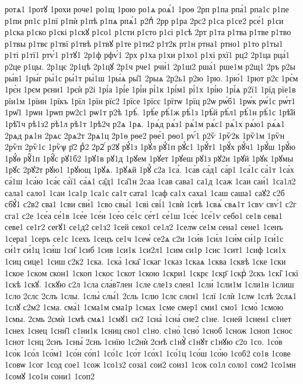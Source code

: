 {ротѧ1
1ротꙋ
1рохи
роче1
ро1щ
1рою
ро1ѧ
роѧ́1
1роѳ
2рп
р1па
рпа́1
рпа1с
р1пе
р1пи
рп1с
р1пї
р1пѝ
р1пѣ
р1пѧ
рпѧ́1
р2пⷣ
2рр
р1ра
2рс2
р1са
р1се2
рсе́1
р1си
р1ска
р1ско
р1скі
р1скꙋ
р1со1
р1сти
р1сто
р1сі
р1сѣ
2рт
р1та
р1тва
р1тве
р1тво
р1твы
р1твє
р1твї
р1твѣ
р1твꙋ
р1те
р1ти2
р1т2к
рт1н
ртна1
ртно1
р1то
р1ты1
р1ті
р1тї1
ртѵ́1
р1тꙋ1
2р1ф
рфѵ́1
2рх
р1ха
р1хи
р1хо1
р1хі
рхї1
рц2
2р1ца
рца́1
р2це
р1цы.
2р1цє
2р1цѣ
2р1цꙋ
2р1ч
рче1
рчи́1
2р1ш2
рша́1
рше1м
р2щ1
2ръ
р2ы
ры́в1
1ры́г
ры́1с
ры́1т
ры́1ш
1ры́ѧ
ры̑1
2рыѧ
2р2ь1
р2ю
1рю.
1рю́1
1рют
р2є
1рє́м
1рє́н
1рєм
рєни1
1рєѝ
р2і
1рі́а
1рі́е
1рі́и
рі́1к
1рі́м1
рі́1х
1рі́ю
1рі́ѧ
р2ї1
1рїд
рїе1в
рїи1м
1рїин
1рїкъ
1рїл
1рїн
рїс2
1рїсе
1рїсє
1рїтѡ
1рїц
р2ѡ
рѡ́б1
1рѡ́к
рѡ́1с
рѡ́т1
1рѡ̑1
1рѡн
1рѡп
рѡ2с1
рѡ1т
р2ѣ
1рѣ́.
1рѣ́е
рѣ́1ж
рѣ́1з
1рѣ́й
рѣ́л1
рѣ́1н
рѣ́1с
1рѣ̑й
1рѣ̑1ч
рѣ1з2
рѣ1л
рѣ1т
1рѣ2ч
р2ѧ
1рѧ.
1рѧ́д
рѧ́з1
рѧ́1м
рѧ́с1
рѧ́1х
рѧ́ю1
рѧ́ѧ1
2рѧд
рѧ1н
2рѧс
2рѧ2т
2рѧ1ц
2р1ѳ
рѳе2
рѳе́1
рѳо1
рѵ́1
р2ѷ
1рѷ2к
1рѷ1м
1рѷн
2рѷп
2рѷ1с
1рѷѱ
р҃2
рⷣ2
2р2ⷭ
р2ꙋ
рꙋ́1з
1рꙋ́л
рꙋ́1п
рꙋ́с1
1рꙋ́т1
1рꙋ́х
рꙋ́ч1
1рꙋ́ш
1рꙋ́ю
1рꙋ́ѳ
рꙋ̑1п
1рꙋ̑с
рꙋ1б2
1рꙋ1в
рꙋ1д
1рꙋем
1рꙋет
1рꙋеш
рꙋ1з
рꙋ2и
1рꙋй
1рꙋк
1рꙋмы
1рꙋс
2рꙋ2т
рꙋю1
1рꙋющ
1рꙋѧ.
1рꙋѧй
1рꙋⷯ
с2а
1са́.
1са́в
са́д1
са́р1
1са́1с
са́1т
1са́х
са́1ш
1са́ю
1са́є
са́ї1
са́ѧ1
са̑д1
1са̑1н
2саа
1сав
сава1
са1д
1саж
1саи
саи́1
1са1л2
сала1
сало1
1сан
1са1р
1са1с
са1т
сата1
1саф
са1х
саха1
1саш
саша1
саꙋ2
с2б
сбꙋ́1
с2в2
сва1
1сви
сви́1
1сво
свы́1
1сві
сві́1
1свѝ
1свѣ
1свѧ́
свѧ1т
1свѵ
свѵ́1
с2г
сга1
с2е
1се́а
се́1в
1се́е
1се́и
1се́о
се́1с
се́т1
се́1ш
1се́є
1се́1ѵ
себо1
се1в
сева1
севе1
се1г2
сегꙋ1
се1д2
се1з2
1сей
секо1
се1л2
1селѡ
се1м
сена1
сене1
1сенъ
1сера1
1серъ
се1с
1сехъ
1сецъ
се1ч
1сеѡ́
се2ѧ
с2и
1си́в
1си́л
1си́м
си́1р
1си́1с
си́1т
си́1ц
1си́ш
1си̑
1сиб
1сив
1си1к
1си2л1
1сим
си1р
1сис
1сит1
1сиф
1си1х
1сиц
сице1
1сиш
с2к2
1ска.
1ска̀
1ска̑
1скаг
1сказ
1скаѧ
1сква
1сквѣ
1ске
1ски
1ское
1ском
скон1
1скоп
1скос
1скот
1скою
1скри1
1скрє
1скр҃
1скрⷭ
2скъ
1скі̑
1скї
1скѣ
1скꙋ.
1скꙋю
с2л
1сла
сла́в7лен
1сле
сле1з
слен1
1сли́
1сли1м
1сли1н
1слиш
1сло
2слс
2слъ
1слы.
1слы̀
слы́1
2сль
1слю
1слє
слєн1
1слї
1слѝ
1слѡ
1слѣ
2слѧ1
1слꙋ
с2м2
1сма.
сма́1
1сма1м
сма1р
1смах
1сме
смер1
сми1
смо1
1смо̀
1смою
1смы.
2смь
2смѝ
1смѣ
смѧ1
1смꙋ1
сн2
1сна̀
1сна́
сне2
с1не.
1сней
1снен1
с1нет
1снех
1снец
1сни̑1
с1ни1к
1сниц
сно1
с1но.
с1но̀
1сно́
1сноб
1снож
1сноп
1снос
1снот
1снц
2снъ
1сны́
2снь
1снїю
1с2нѝ
2снѣ
с1нꙋ̀
с1нꙋт
с1нꙋю
с2о
1со.
1со́в
1со́к
1со́л
1со́м1
1со́н
со́п1
1со́1с
1со́т
1со́х1
1со́1ц
1со́ш
1со́ю
1соб2
со1в
1сове
1совѡ
1сог
1сод
сое1
1сож
1со1з2
соза1
сои2
соиз1
1сок
со1л
соло1
сом2
1со1мн
1сомꙋ
1со1н
сони1
1соп2
}
